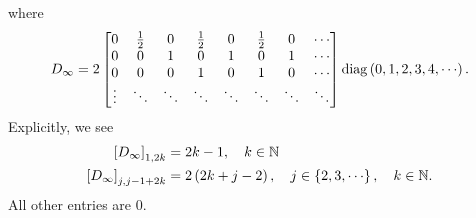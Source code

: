\noindent
where
%
\begin{equation}
    D_{\infty} = 2\begin{bmatrix}
            0 & \frac{1}{2} & 0 & \frac{1}{2} & 0 & \frac{1}{2} & 0 & \cdots \\
            0 & 0 & 1 & 0           & 1 & 0           & 1 & \cdots \\
            0 & 0 & 0 & 1           & 0 & 1           & 0 & \cdots \\
            \vdots & \ddots & \ddots & \ddots & \ddots & \ddots & \ddots
                   & \ddots \\
        \end{bmatrix}
        \diag\parens{0,1,2,3,4,\cdots}.
\end{equation}
%
Explicitly, we see
%
\begin{align}
    \brackets{D_{\infty}}_{1,2k} &= 2k-1,\quad k\in\N \nonumber\\
    \brackets{D_{\infty}}_{j,j-1+2k} &= 2\parens{2k+j-2},
        \quad j\in\braces{2,3,\cdots},\quad k\in\N.
\end{align}
%
All other entries are 0.


